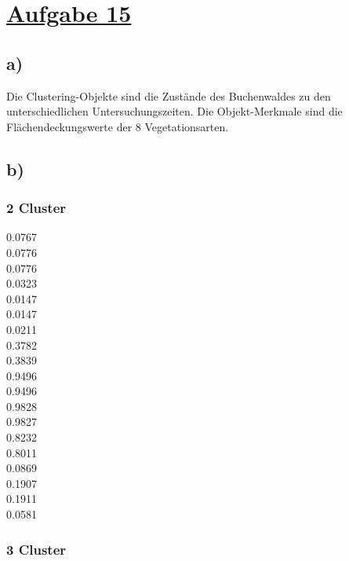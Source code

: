 \section*{\underline{Aufgabe 15}}

\subsection*{a)}

Die Clustering-Objekte sind die Zustände des Buchenwaldes zu den unterschiedlichen Untersuchungszeiten. Die Objekt-Merkmale sind die Flächendeckungswerte der 8 Vegetationsarten.

\subsection*{b)}

\subsubsection*{2 Cluster}

0.0767  \\
0.0776  \\
0.0776  \\
0.0323  \\
0.0147  \\
0.0147  \\
0.0211  \\
0.3782  \\
0.3839  \\
0.9496  \\
0.9496  \\
0.9828  \\
0.9827  \\
0.8232  \\
0.8011  \\
0.0869  \\
0.1907  \\
0.1911  \\
0.0581  

\subsubsection*{3 Cluster}

